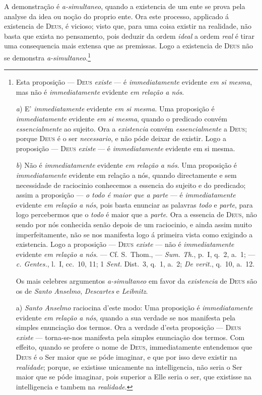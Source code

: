 A demonstração é \emph{a-simultaneo}, quando a existencia de um ente se prova pela
analyse da idea ou noção do proprio ente. Ora este processo, applicado á existencia de
\textsc{Deus}, é vicioso; visto que, para uma coisa existir na realidade, não basta que
exista no pensamento, pois deduzir da ordem \emph{ideal} a ordem \emph{real} é tirar
uma consequencia mais extensa que as premissas. Logo a existencia de \textsc{Deus} não
se demonstra \emph{a-simultaneo}.\footnote{Esta proposição --- \textsc{Deus} \emph{existe} --- é \emph{immediatamente} evidente
\emph{em si mesma}, mas não é \emph{immediatamente} evidente \emph{em relação a nós}.

\emph{a}) E' \emph{immediatamente} evidente \emph{em si mesma}. Uma proposição é
\emph{immediatamente} evidente \emph{em si mesma}, quando o predicado convém
\emph{essencialmente} ao sujeito. Ora a \emph{existencia} convém \emph{essencialmente}
a \textsc{Deus}; porque \textsc{Deus} é o ser \emph{necessario}, e não póde deixar de
existir. Logo a proposição --- \textsc{Deus} \emph{existe} --- é \emph{immediatamente}
evidente em si mesma.

\emph{b}) Não é \emph{immediatamente} evidente \emph{em relação a nós}. Uma proposição é
\emph{immediatamente} evidente em relação a nós, quando directamente e sem necessidade
de raciocinio conhecemos a essencia do sujeito e do predicado; assim a proposição ---
\emph{o todo é maior que a parte} --- é \emph{immediatamente} evidente \emph{em relação
a nós}, pois basta enunciar as palavras \emph{todo} e \emph{parte}, para logo
percebermos que o \emph{todo} é maior que a \emph{parte}. Ora a essencia de
\textsc{Deus}, não sendo por nós conhecida senão depois de um raciocinio, e ainda assim
muito imperfeitamente, não se nos manifesta logo á primeira vista como exigindo a
existencia. Logo a proposição --- \textsc{Deus} \emph{existe} --- não é
\emph{immediatamente} evidente \emph{em relação a nós}. --- Cf. S.~Thom., ---
\emph{Sum. Th.}, p.~I, q.~2, a.~1; --- \emph{c. Gentes.}, l.~I, cc.~10, 11; 1
\emph{Sent.} Dist.~3, q.~1, a.~2; \emph{De verit.}, q.~10, a.~12.

Os mais celebres argumentos \emph{a-simultaneo} em favor da \emph{existencia} de
\textsc{Deus} são os de \emph{Santo Anselmo}, \emph{Descartes} e \emph{Leibnitz}.

a) \emph{Santo Anselmo} raciocina d'este modo: Uma proposição é \emph{immediatamente}
evidente \emph{em relação a nós}, quando a sua verdade se nos manifesta pela simples
enunciação dos termos. Ora a verdade d'esta proposição --- \textsc{Deus} \emph{existe}
--- torna-se-nos manifesta pela simples enunciação dos termos. Com effeito, quando se
profere o nome de \textsc{Deus}, immediatamente entendemos que \textsc{Deus} é o Ser
maior que se póde imaginar, e que por isso deve existir na \emph{realidade}; porque, se
existisse unicamente na intelligencia, não seria o Ser maior que se póde imaginar, pois
superior a Elle seria o ser, que existisse na intelligencia e tambem na
\emph{realidade}.

}
